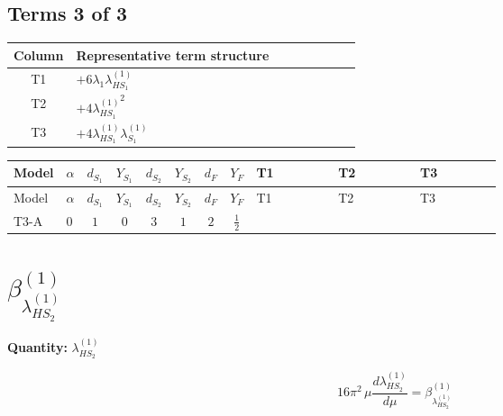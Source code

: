 \documentclass[8pt]{article}
\begin{document}
\begin{landscape}
\subsection*{Terms 3 of 3}
\begin{center}
\begin{tabular}{@{}c >{\raggedright\arraybackslash}p{0.82\linewidth}@{}}
\toprule
Column & Representative term structure \\
\midrule
T1 & \(\displaystyle +6 {\lambda_1} {\lambda_{HS_1}^{(1)}}\) \\
\midrule
T2 & \(\displaystyle +4 {\lambda_{HS_1}^{(1)}}^2\) \\
\midrule
T3 & \(\displaystyle +4 {\lambda_{HS_1}^{(1)}} {\lambda_{S_1}^{(1)}}\) \\
\midrule
\bottomrule
\end{tabular}
\end{center}
\smallskip
\tiny
\begin{longtable}{@{}llcccccc >{\raggedright\arraybackslash}p{0.21\linewidth} >{\raggedright\arraybackslash}p{0.21\linewidth} >{\raggedright\arraybackslash}p{0.21\linewidth}@{}}
\toprule
Model & $\alpha$ & $d_{S_1}$ & $Y_{S_1}$ & $d_{S_2}$ & $Y_{S_2}$ & $d_F$ & $Y_F$ & T1 & T2 & T3 \\
\midrule
\endfirsthead
\toprule
Model & $\alpha$ & $d_{S_1}$ & $Y_{S_1}$ & $d_{S_2}$ & $Y_{S_2}$ & $d_F$ & $Y_F$ & T1 & T2 & T3 \\
\midrule
\endhead
T3-A & $0$ & $1$ & $0$ & $3$ & $1$ & $2$ & $\frac{1}{2}$ & \scriptsize\adjustbox{max width=\linewidth}{$\begin{gathered} +6 {\lambda_1} {\lambda_{HS_1}^{(1)}}\end{gathered}$} & \scriptsize\adjustbox{max width=\linewidth}{$\begin{gathered} +4 {\lambda_{HS_1}^{(1)}}^2\end{gathered}$} & \scriptsize\adjustbox{max width=\linewidth}{$\begin{gathered} +4 {\lambda_{HS_1}^{(1)}} {\lambda_{S_1}^{(1)}}\end{gathered}$} \\
\midrule
\bottomrule
\end{longtable}
\clearpage
\section*{$\beta_{\lambda_{HS_2}^{(1)}}^{(1)}$}
\noindent\textbf{Quantity: }$\lambda_{HS_2}^{(1)}$\par\smallskip
\[16\pi^2\,\mu\frac{d \lambda_{HS_2}^{(1)}}{d\mu}=\beta_{\lambda_{HS_2}^{(1)}}^{(1)}\]

\end{landscape}
\end{document}
